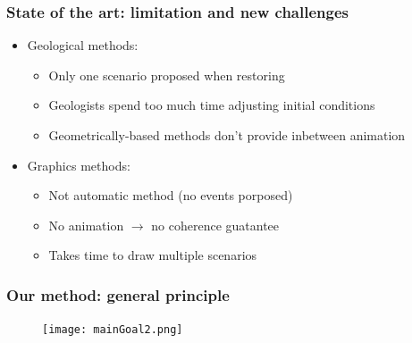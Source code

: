 \documentclass{beamer}
\begin{document}
	\begin{frame}
	\frametitle{State of the art: limitation and new challenges}
	\begin{itemize}
	\item Geological methods: 
		\begin{itemize}
		 \item Only one scenario proposed when restoring
		 \item Geologists spend too much time adjusting initial conditions
		 \item Geometrically-based methods don't provide inbetween animation
		\end{itemize}
	\item Graphics methods:
	\begin{itemize}
	\item Not automatic method (no events porposed)
	\item No animation $\longrightarrow$ no coherence guatantee
	\item Takes time to draw multiple scenarios
	\end{itemize}
	\end{itemize}
    \end{frame}	
    
    \begin{frame}
	\frametitle{Our method: general principle}
	 \begin{figure}[H]
	\centering
	\texttt{[image: mainGoal2.png]}
	\label{maingoal}
	\end{figure}
	\end{frame}
       
\end{document}
